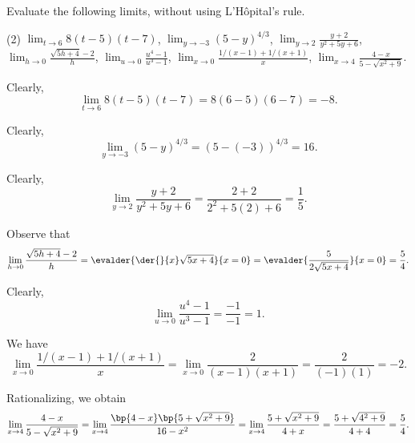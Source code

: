 \clearpage
\begin{problem}
    Evaluate the following limits, without using L'H\^{o}pital's rule.

    \begin{tasks}(2)
        \task $\displaystyle \lim_{t \to 6} 8(t-5)(t-7)$,
        \task $\displaystyle \lim_{y \to -3} (5-y)^{4/3}$,
        \task $\displaystyle \lim_{y \to 2} \frac{y+2}{y^2 + 5y + 6}$,
        \task $\displaystyle \lim_{h \to 0} \frac{\sqrt{5h + 4} - 2}{h}$,
        \task $\displaystyle \lim_{u \to 0} \frac{u^4 - 1}{u^3 - 1}$,
        \task $\displaystyle \lim_{x \to 0} \frac{1/(x-1) + 1/(x+1)}{x}$,
        \task $\displaystyle \lim_{x \to 4} \frac{4-x}{5 - \sqrt{x^2 + 9}}$.
    \end{tasks}
\end{problem}
\begin{solution}
    \begin{ppart}
        Clearly, \[\lim_{t \to 6} 8(t-5)(t-7) = 8(6-5)(6-7) = -8.\]
    \end{ppart}
    \begin{ppart}
        Clearly, \[\lim_{y \to -3} (5-y)^{4/3} = (5 - (-3))^{4/3} = 16.\]
    \end{ppart}
    \begin{ppart}
        Clearly, \[\lim_{y \to 2} \frac{y+2}{y^2 + 5y + 6} = \frac{2 + 2}{2^2 + 5(2) + 6} = \frac15.\]
    \end{ppart}
    \begin{ppart}
        Observe that \[\lim_{h \to 0} \frac{\sqrt{5h + 4} - 2}{h} = \evalder{\der{}{x} \sqrt{5x + 4}}{x = 0} = \evalder{\frac5{2\sqrt{5x + 4}}}{x=0} = \frac54.\]
    \end{ppart}
    \begin{ppart}
        Clearly, \[\lim_{u \to 0} \frac{u^4 - 1}{u^3 - 1} = \frac{-1}{-1} = 1.\]
    \end{ppart}
    \begin{ppart}
        We have \[\lim_{x \to 0} \frac{1/(x-1) + 1/(x+1)}{x} = \lim_{x \to 0} \frac2{(x-1)(x+1)} = \frac2{(-1)(1)} = -2.\]
    \end{ppart}
    \begin{ppart}
        Rationalizing, we obtain \[\lim_{x \to 4} \frac{4-x}{5 - \sqrt{x^2 + 9}} = \lim_{x \to 4} \frac{\bp{4-x} \bp{5 + \sqrt{x^2 + 9}}}{16 - x^2} = \lim_{x \to 4} \frac{5 + \sqrt{x^2 + 9}}{4 + x} = \frac{5 + \sqrt{4^2 + 9}}{4 + 4} = \frac54.\]
    \end{ppart}
\end{solution}


